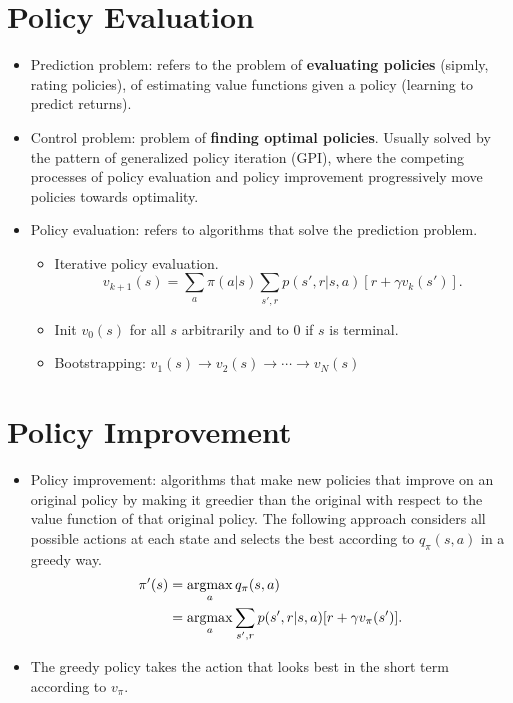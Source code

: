 \section{Policy Evaluation}
\begin{itemize}
	\item Prediction problem: refers to the problem of \textbf{evaluating policies} (sipmly, rating policies), of estimating value functions given a policy (learning to predict returns).
	\item Control problem: problem of \textbf{finding optimal policies}. Usually solved by the pattern of generalized policy iteration (GPI), where the competing processes of policy evaluation and policy improvement progressively move policies towards optimality.
	\item Policy evaluation: refers to algorithms that solve the prediction problem.
		\begin{itemize}
			\item Iterative policy evaluation.
				$$v_{k+1}(s)=\sum_{a}\pi(a|s)\sum_{s',r}p(s',r|s,a)[r + \gamma v_k(s')].$$ 
			\item Init $v_0(s)$ for all $s$ arbitrarily and to 0 if $s$ is terminal. 
			\item Bootstrapping: $v_1(s)\to v_2(s)\to\cdots\to v_N(s)$
		\end{itemize}
\end{itemize}

\section{Policy Improvement}
\begin{itemize}
	\item Policy improvement: algorithms that make new policies that improve on an original policy by making it greedier than the original with respect to the value function of that original policy. The following approach considers all possible actions at each state and selects the best according to $q_\pi(s,a)$ in a greedy way. 
		\begin{align*}
			\pi'(s) &= \operatorname*{\operatorname{argmax}}_a q_\pi(s,a)\\
			&= \operatorname*{\operatorname{argmax}}_a \sum_{s',r}p(s',r|s,a)[r + \gamma v_\pi(s')].
		\end{align*}
	\item The greedy policy takes the action that looks best in the short term according to $v_\pi$.
\end{itemize}
